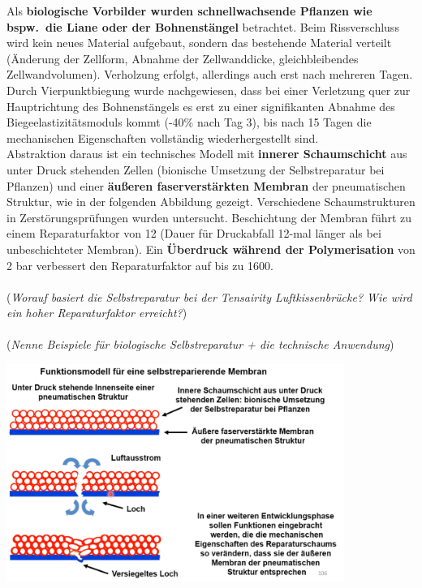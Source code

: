 Als \textbf{biologische Vorbilder wurden schnellwachsende Pflanzen wie bspw.\ die Liane oder der Bohnenstängel} betrachtet. Beim Rissverschluss wird kein neues Material aufgebaut, sondern das bestehende Material verteilt (Änderung der Zellform, Abnahme der Zellwanddicke, gleichbleibendes Zellwandvolumen). Verholzung erfolgt, allerdings auch erst nach mehreren Tagen. Durch Vierpunktbiegung wurde nachgewiesen, dass bei einer Verletzung quer zur Hauptrichtung des Bohnenstängels es erst zu einer signifikanten Abnahme des Biegeelastizitätsmoduls kommt (-40\% nach Tag 3), bis nach 15 Tagen die mechanischen Eigenschaften vollständig wiederhergestellt sind.\\

Abstraktion daraus ist ein technisches Modell mit \textbf{innerer Schaumschicht} aus unter Druck stehenden Zellen (bionische Umsetzung der Selbstreparatur bei Pflanzen) und einer \textbf{äußeren faserverstärkten Membran} der pneumatischen Struktur, wie in der folgenden Abbildung gezeigt. Verschiedene Schaumstrukturen in Zerstörungsprüfungen wurden untersucht. Beschichtung der Membran führt zu einem Reparaturfaktor von 12 (Dauer für Druckabfall 12-mal länger als bei unbeschichteter Membran). Ein \textbf{Überdruck während der Polymerisation} von 2 bar verbessert den Reparaturfaktor auf bis zu 1600.
\\\\
(\dangersign \textit{Worauf basiert die Selbstreparatur bei der Tensairity Luftkissenbrücke? Wie wird ein hoher Reparaturfaktor erreicht?})
\\\\
(\dangersign \textit{Nenne Beispiele für biologische Selbstreparatur + die technische Anwendung})


\begin{center}
    \includegraphics[width=11cm]{lec5/figures/funktionsmodell.png}
\end{center}

